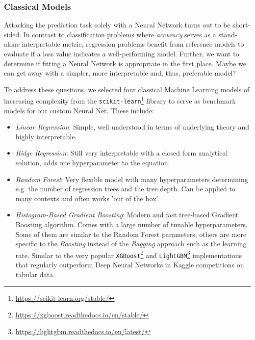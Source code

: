 \subsubsection{Classical Models} \label{classical-models}

Attacking the prediction task solely with a Neural Network turns out to be short-sided.
In contrast to classification problems where \emph{accuracy} serves as a stand-alone interpretable metric, regression problems benefit from reference models to evaluate if a loss value indicates a well-performing model.
Further, we want to determine if fitting a Neural Network is appropriate in the first place.
Maybe we can get away with a simpler, more interpretable and, thus, preferable model?

To address these questions, we selected four classical Machine Learning models of increasing complexity from the \texttt{scikit-learn}\footnote{\url{https://scikit-learn.org/stable/}} library \citep{pedregosa2011} to serve as benchmark models for our custom Neural Net.
These include:
\begin{itemize}
      \item \textit{Linear Regression}:
            Simple, well understood in terms of underlying theory and highly interpretable.
      \item \textit{Ridge Regression}:
            Still very interpretable with a closed form analytical solution, adds one hyperparameter to the equation.
      \item \textit{Random Forest}:
            Very flexible model with many hyperparameters determining e.g. the number of regression trees and the tree depth.
            Can be applied to many contexts and often works 'out of the box'.
      \item \textit{Histogram-Based Gradient Boosting}:
            Modern and fast tree-based Gradient Boosting algorithm.
            Comes with a large number of tunable hyperparameters.
            Some of them are similar to the Random Forest parameters, others are more specific to the \emph{Boosting} instead of the \emph{Bagging} approach such as the learning rate.
            Similar to the very popular \texttt{XGBoost}\footnote{\url{https://xgboost.readthedocs.io/en/stable/}} \citep{chen2016} and \texttt{LightGBM}\footnote{\url{https://lightgbm.readthedocs.io/en/latest/}} \citep{ke2017} implementations that regularly outperform Deep Neural Networks in Kaggle competitions on tabular data.
\end{itemize}

